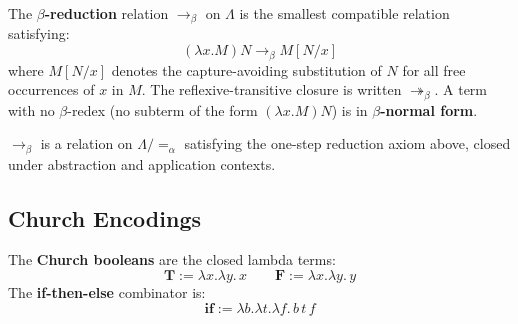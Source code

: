 \begin{tcolorbox}[colback=propbox, colframe=propborder, arc=2pt,
  left=6pt, right=6pt, top=4pt, bottom=4pt,
  title={\small\textbf{Definition ($\beta$-Reduction)}},
  fonttitle=\small\bfseries]
\label{def:beta-reduction}
The \textbf{$\beta$-reduction} relation $\to_\beta$ on $\Lambda$
is the smallest compatible relation satisfying:
\[
  (\lambda x.M)N \to_\beta M[N/x]
\]
where $M[N/x]$ denotes the capture-avoiding substitution of $N$
for all free occurrences of $x$ in $M$.
The reflexive-transitive closure is written $\twoheadrightarrow_\beta$.
A term with no $\beta$-redex (no subterm of the form
$(\lambda x.M)N$) is in \textbf{$\beta$-normal form}.
\end{tcolorbox}

\begin{remark*}
$\to_\beta$ is a relation on $\Lambda/\!=_\alpha$ satisfying the
one-step reduction axiom above, closed under abstraction and
application contexts.
\end{remark*}

\begin{remark*}[Flash]
\end{remark*}


\subsection*{Church Encodings}

\begin{tcolorbox}[colback=propbox, colframe=propborder, arc=2pt,
  left=6pt, right=6pt, top=4pt, bottom=4pt,
  title={\small\textbf{Definition (Church Booleans)}},
  fonttitle=\small\bfseries]
\label{def:church-booleans}
The \textbf{Church booleans} are the closed lambda terms:
\[
  \mathbf{T} := \lambda x.\lambda y.\,x
  \qquad
  \mathbf{F} := \lambda x.\lambda y.\,y
\]
The \textbf{if-then-else} combinator is:
\[
  \mathbf{if} := \lambda b.\lambda t.\lambda f.\,b\,t\,f
\]
\end{tcolorbox}

